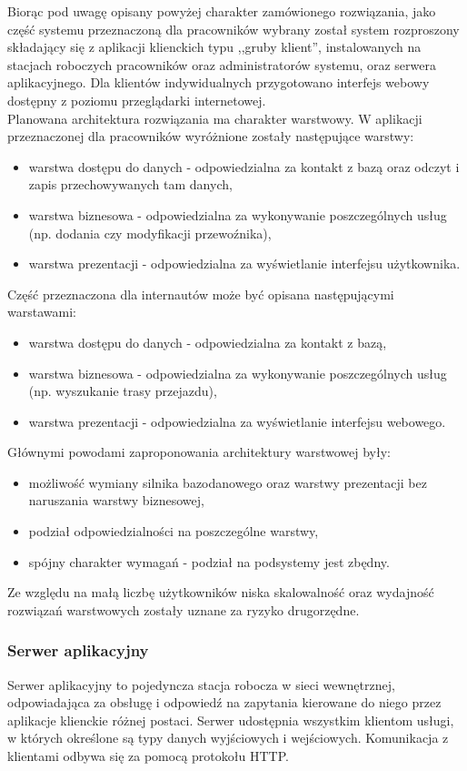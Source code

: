 \documentclass[10pt,a4paper]{article}
\begin{document}
\noindent
Biorąc pod uwagę opisany powyżej charakter zamówionego rozwiązania, jako część systemu przeznaczoną dla pracowników wybrany został system rozproszony składający się z aplikacji klienckich typu ,,gruby klient'', instalowanych na stacjach roboczych pracowników oraz administratorów systemu, oraz serwera aplikacyjnego. Dla klientów indywidualnych przygotowano interfejs webowy dostępny z poziomu przeglądarki internetowej.\\[\baselineskip]
Planowana architektura rozwiązania ma charakter warstwowy. W aplikacji przeznaczonej dla pracowników wyróżnione zostały następujące warstwy:
\begin{itemize}
	\item warstwa dostępu do danych - odpowiedzialna za kontakt z bazą oraz odczyt i zapis przechowywanych tam danych,
	\item warstwa biznesowa - odpowiedzialna za wykonywanie poszczególnych usług (np. dodania czy modyfikacji przewoźnika),
	\item warstwa prezentacji - odpowiedzialna za wyświetlanie interfejsu użytkownika.
\end{itemize}
Część przeznaczona dla internautów może być opisana następującymi warstawami:
\begin{itemize}
	\item warstwa dostępu do danych - odpowiedzialna za kontakt z bazą,
	\item warstwa biznesowa - odpowiedzialna za wykonywanie poszczególnych usług (np. wyszukanie trasy przejazdu),
	\item warstwa prezentacji - odpowiedzialna za wyświetlanie interfejsu webowego.
\end{itemize}
Głównymi powodami zaproponowania architektury warstwowej były:
\begin{itemize}
	\item możliwość wymiany silnika bazodanowego oraz warstwy prezentacji bez naruszania warstwy biznesowej,
	\item podział odpowiedzialności na poszczególne warstwy,
	\item spójny charakter wymagań - podział na podsystemy jest zbędny.
\end{itemize}
Ze względu na małą liczbę użytkowników niska skalowalność oraz wydajność rozwiązań warstwowych zostały uznane za ryzyko drugorzędne.

\subsubsection{Serwer aplikacyjny}
Serwer aplikacyjny to pojedyncza stacja robocza w sieci wewnętrznej, odpowiadająca za obsługę i odpowiedź na zapytania kierowane do niego przez aplikacje klienckie różnej postaci. Serwer udostępnia wszystkim klientom usługi, w których określone są typy danych wyjściowych i wejściowych. Komunikacja z klientami odbywa się za pomocą protokołu HTTP.
\end{document}
